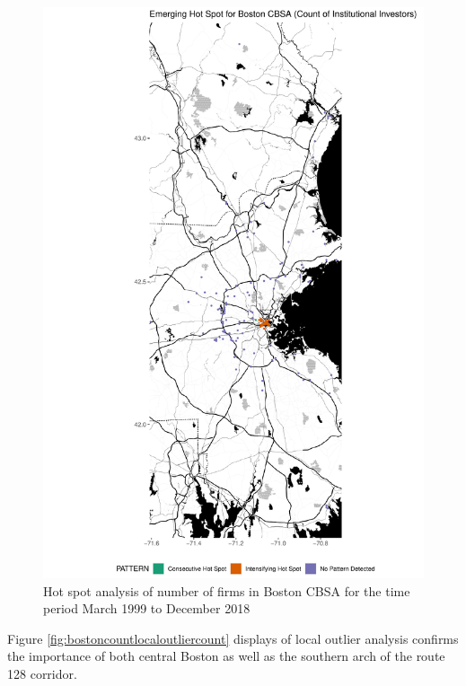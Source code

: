 \begin{figure}
	\centering
	\includegraphics[width=1\linewidth]{Figures/ChapterIV/Bos_Count_EH}
	\caption[Hot Spot Analysis of Number of Firms in Boston CBSA 1999-2018]{Hot spot analysis of number of firms in Boston CBSA for the time period March 1999 to December 2018}
	\label{fig:bostoncounthotspot}
\end{figure}

Figure \ref{fig:bostoncountlocaloutliercount} displays of local outlier analysis confirms the importance of both central Boston as well as the southern arch of the route 128 corridor.   	


